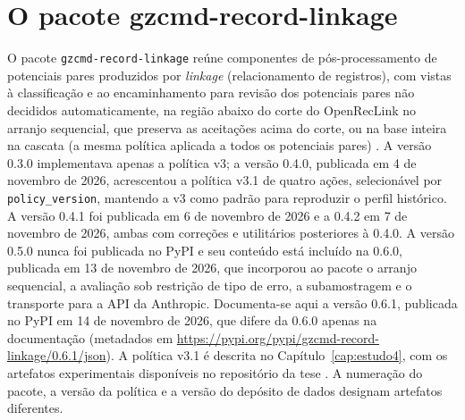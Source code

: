 \chapter{O pacote gzcmd-record-linkage}\label{ap:pacote}

O pacote \texttt{gzcmd-record-linkage} reúne componentes de pós-processamento de potenciais pares produzidos por \textit{linkage} (relacionamento de registros), com vistas à classificação e ao encaminhamento para revisão dos potenciais pares não decididos automaticamente, na região abaixo do corte do OpenRecLink no arranjo sequencial, que preserva as aceitações acima do corte, ou na base inteira na cascata (a mesma política aplicada a todos os potenciais pares) \cite{Jardim2026gzcmd}. A versão 0.3.0 implementava apenas a política v3; a versão 0.4.0, publicada em 4 de novembro de 2026, acrescentou a política v3.1 de quatro ações, selecionável por \texttt{policy\_version}, mantendo a v3 como padrão para reproduzir o perfil histórico. A versão 0.4.1 foi publicada em 6 de novembro de 2026 e a 0.4.2 em 7 de novembro de 2026, ambas com correções e utilitários posteriores à 0.4.0. A versão 0.5.0 nunca foi publicada no PyPI e seu conteúdo está incluído na 0.6.0, publicada em 13 de novembro de 2026, que incorporou ao pacote o arranjo sequencial, a avaliação sob restrição de tipo de erro, a subamostragem e o transporte para a API da Anthropic. Documenta-se aqui a versão 0.6.1, publicada no PyPI em 14 de novembro de 2026, que difere da 0.6.0 apenas na documentação (metadados em \url{https://pypi.org/pypi/gzcmd-record-linkage/0.6.1/json}). A política v3.1 é descrita no Capítulo~\ref{cap:estudo4}, com os artefatos experimentais disponíveis no repositório da tese \cite{Jardim2026phdrepo}. A numeração do pacote, a versão da política e a versão do depósito de dados designam artefatos diferentes.

